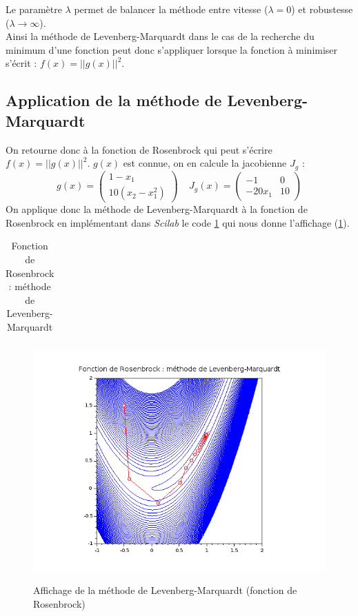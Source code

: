 \documentclass[a4paper,10pt]{report}
\begin{document}
Le paramètre $\lambda$ permet de balancer la méthode entre vitesse ($\lambda = 0$) et robustesse ($\lambda\longrightarrow \infty$). \\

Ainsi la méthode de Levenberg-Marquardt dans le cas de la recherche du minimum d'une fonction peut donc s'appliquer lorsque la fonction à minimiser s'écrit : $f(x)=||g(x)||^2$.

\subsection{Application de la méthode de Levenberg-Marquardt}
On retourne donc à la fonction de Rosenbrock qui peut s'écrire $f(x)=||g(x)||^2$. $g(x)$ est connue, on en calcule la jacobienne $J_g$ :
\abovedisplayskip=0mm
\begin{displaymath}
g(x) = \left( \begin{array}{c} 1 - x_1 \\ 10(x_2-x_1^2) \end{array} \right) \ \ \ \ \ J_g(x) = \left( \begin{array}{cc} -1 & 0 \\ -20x_1 & 10 \end{array} \right)
\end{displaymath}
On applique donc la méthode de Levenberg-Marquardt à la fonction de Rosenbrock en implémentant dans \textit{Scilab} le code \ref{banana_levenberg} qui nous donne l'affichage (\ref{banana_graph2}).

\begin{table}[H]
\caption{Fonction de Rosenbrock : méthode de Levenberg-Marquardt}
\begin{tabular}{l}

\label{banana_levenberg}
\end{tabular}
\end{table}

\begin{figure}[H]
\centering
\caption{Affichage de la méthode de Levenberg-Marquardt (fonction de Rosenbrock)}
\includegraphics[width=13cm]{banana_2.png}
\label{banana_graph2}
\end{figure}
\end{document}
